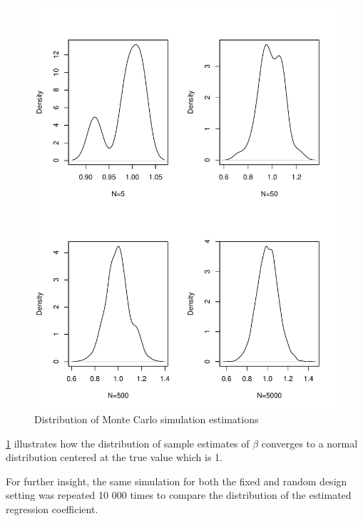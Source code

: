 \documentclass[nohyperref]{article}
\theoremstyle{plain}
\theoremstyle{definition}
\theoremstyle{remark}
\begin{document}
\begin{figure}[!h]
\begin{center}
\centerline{\includegraphics[width=\columnwidth]{montecarloRandom.pdf}}
\caption{Distribution of Monte Carlo simulation estimations}
\label{montecarloRandom}
\end{center}
\vskip -0.2in
\end{figure}

\cref{montecarloRandom} illustrates how the distribution of sample estimates of $\beta$ converges to a normal distribution centered at the true value which is 1. 

For further insight, the same simulation for both the fixed and random design setting was repeated 10 000 times to compare the distribution of the estimated regression coefficient.

\pagebreak
\end{document}
